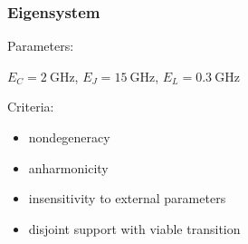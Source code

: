 \documentclass[10pt]{beamer}
\begin{document}



\setcounter{subfigure}{0}

\begin{frame}[shrink=10]
\frametitle{Eigensystem}

\begin{minipage}[c]{0.49\linewidth}

\vspace{2ex}

\small

Parameters:

$E_C = \SI{2}{\giga\hertz}$, $E_J = \SI{15}{\giga\hertz}$, $E_L = \SI{0.3}{\giga\hertz}$

\vspace{2ex}

Criteria:
\begin{itemize}
\item nondegeneracy
\item anharmonicity
\item insensitivity to external parameters
\item disjoint support with viable transition
\end{itemize}


\end{minipage}
\end{frame}
\end{document}
